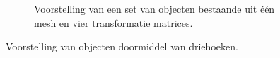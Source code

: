 \begin{figure}[p]
\begin{subfigure}[b]{.95\linewidth}
    \caption{Voorstelling van een set van objecten bestaande uit \'e\'en mesh en vier transformatie matrices.}\label{fig:gd-object-obj}
  \end{subfigure}
  \caption{Voorstelling van objecten doormiddel van driehoeken.}
  \label{fig:gd-object}
\end{figure}

